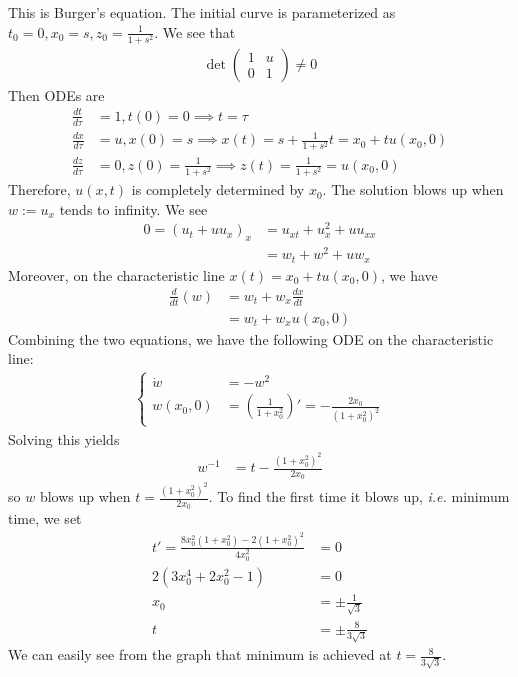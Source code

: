 \documentclass[12pt]{article}
\begin{document}
\begin{problem}[3]
This is Burger's equation. The initial curve is parameterized as $t_0=0, x_0=s, z_0 = \frac{1}{1+s ^2}$. We see that
\begin{align*}
	\det \begin{pmatrix}   1&u\\0&1 \end{pmatrix} \neq 0 
\end{align*}
Then ODEs are
\begin{align*}
	\frac{dt}{ d \tau} &= 1, t(0)=0 \implies t = \tau\\
	\frac{dx}{ d \tau} &= u, x(0) = s \implies x(t)= s+ \frac{1}{1+s^2}t =x_0+tu(x_0,0)\\
	\frac{dz}{ d \tau} &= 0, z(0) = \frac{1}{1+s ^2} \implies z(t) = \frac{1}{1+s ^2} = u(x_0,0)
\end{align*}
Therefore, $ u(x,t)$ is completely determined by  $ x_0$. The solution blows up when $ w:=u_x$ tends to infinity. We see
 \begin{align*}
	0=\left( u_t+uu_x \right) _x &= u_{xt} + u_x ^2 + uu_{xx} \\
	&= w_t+w^2+uw_x 
\end{align*}
Moreover, on the characteristic line $ x(t)= x_0+tu(x_0,0)$, we have
\begin{align*}
	\frac{d}{dt}(w) &= w_t + w_x \frac{d x}{d t}  \\
	&= w_t + w_x u(x_0,0)
\end{align*}
Combining the two equations, we have the following ODE on the characteristic line:
\begin{align*}
	\begin{cases}
		\dot{w} &= -w^2\\
		w(x_0,0) &= \left( \frac{1}{1+x_0^2} \right)' = -\frac{2x_0}{ (1+x_0^2)^2}
	\end{cases}
\end{align*}
Solving this yields
\begin{align*}
	w^{-1}&= t - \frac{(1+x_0^2)^2}{ 2x_0}
\end{align*}
so $ w$ blows up when  $ t= \frac{(1+x_0^2)^2}{  2x_0}$. To find the first time it blows up, \emph{i.e.} minimum time, we set
\begin{align*}
	t' = \frac{ 8x_0^2(1+x_0^2)-2(1+x_0^2)^2}{ 4x_0^{2}} &=0\\
	2(3x_0^{4}+2x_0^2-1) &= 0 \\
	x_0 &= \pm \frac{1}{\sqrt{3} } \\
	t &= \pm \frac{8}{ 3 \sqrt{3}}
\end{align*}
We can easily see from the graph that minimum is achieved at $ t= \frac{8}{ 3 \sqrt{3}}$.
\end{problem}
\end{document}
